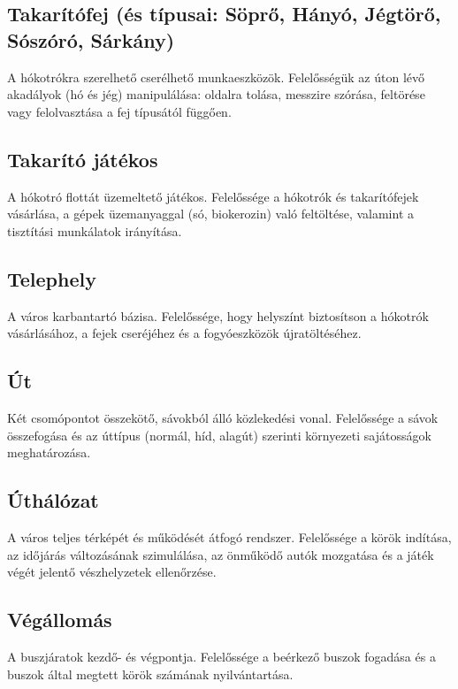 \subsection{Takarítófej (és típusai: Söprő, Hányó, Jégtörő, Sószóró, Sárkány)}
\par{A hókotrókra szerelhető cserélhető munkaeszközök. Felelősségük az úton lévő akadályok (hó és jég) manipulálása: oldalra tolása, messzire szórása, feltörése vagy felolvasztása a fej típusától függően.}

\subsection{Takarító játékos}
\par{A hókotró flottát üzemeltető játékos. Felelőssége a hókotrók és takarítófejek vásárlása, a gépek üzemanyaggal (só, biokerozin) való feltöltése, valamint a tisztítási munkálatok irányítása.}

\subsection{Telephely}
\par{A város karbantartó bázisa. Felelőssége, hogy helyszínt biztosítson a hókotrók vásárlásához, a fejek cseréjéhez és a fogyóeszközök újratöltéséhez.}

\subsection{Út}
\par{Két csomópontot összekötő, sávokból álló közlekedési vonal. Felelőssége a sávok összefogása és az úttípus (normál, híd, alagút) szerinti környezeti sajátosságok meghatározása.}

\subsection{Úthálózat}
\par{A város teljes térképét és működését átfogó rendszer. Felelőssége a körök indítása, az időjárás változásának szimulálása, az önműködő autók mozgatása és a játék végét jelentő vészhelyzetek ellenőrzése.}

\subsection{Végállomás}
\par{A buszjáratok kezdő- és végpontja. Felelőssége a beérkező buszok fogadása és a buszok által megtett körök számának nyilvántartása.}

